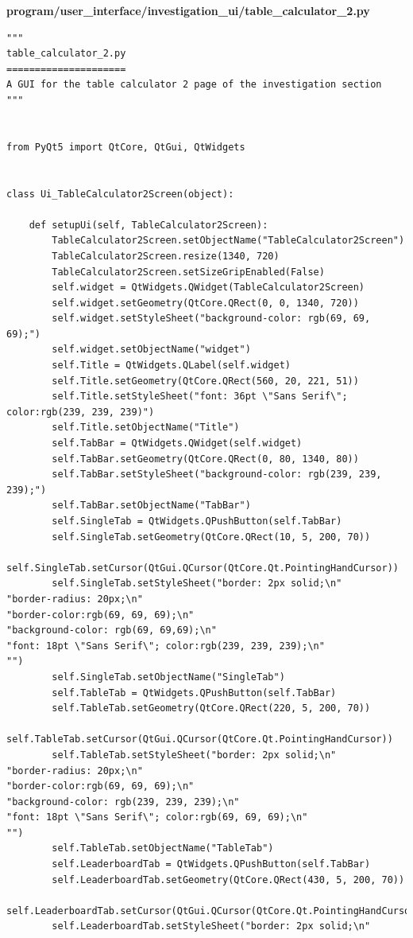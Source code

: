 \documentclass{article}
\begin{document}
\textbf{program/user\_interface/investigation\_ui/table\_calculator\_2.py}
\begin{lstlisting}
"""
table_calculator_2.py
=====================
A GUI for the table calculator 2 page of the investigation section
"""


from PyQt5 import QtCore, QtGui, QtWidgets


class Ui_TableCalculator2Screen(object):

    def setupUi(self, TableCalculator2Screen):
        TableCalculator2Screen.setObjectName("TableCalculator2Screen")
        TableCalculator2Screen.resize(1340, 720)
        TableCalculator2Screen.setSizeGripEnabled(False)
        self.widget = QtWidgets.QWidget(TableCalculator2Screen)
        self.widget.setGeometry(QtCore.QRect(0, 0, 1340, 720))
        self.widget.setStyleSheet("background-color: rgb(69, 69, 69);")
        self.widget.setObjectName("widget")
        self.Title = QtWidgets.QLabel(self.widget)
        self.Title.setGeometry(QtCore.QRect(560, 20, 221, 51))
        self.Title.setStyleSheet("font: 36pt \"Sans Serif\"; color:rgb(239, 239, 239)")
        self.Title.setObjectName("Title")
        self.TabBar = QtWidgets.QWidget(self.widget)
        self.TabBar.setGeometry(QtCore.QRect(0, 80, 1340, 80))
        self.TabBar.setStyleSheet("background-color: rgb(239, 239, 239);")
        self.TabBar.setObjectName("TabBar")
        self.SingleTab = QtWidgets.QPushButton(self.TabBar)
        self.SingleTab.setGeometry(QtCore.QRect(10, 5, 200, 70))
        self.SingleTab.setCursor(QtGui.QCursor(QtCore.Qt.PointingHandCursor))
        self.SingleTab.setStyleSheet("border: 2px solid;\n"
"border-radius: 20px;\n"
"border-color:rgb(69, 69, 69);\n"
"background-color: rgb(69, 69,69);\n"
"font: 18pt \"Sans Serif\"; color:rgb(239, 239, 239);\n"
"")
        self.SingleTab.setObjectName("SingleTab")
        self.TableTab = QtWidgets.QPushButton(self.TabBar)
        self.TableTab.setGeometry(QtCore.QRect(220, 5, 200, 70))
        self.TableTab.setCursor(QtGui.QCursor(QtCore.Qt.PointingHandCursor))
        self.TableTab.setStyleSheet("border: 2px solid;\n"
"border-radius: 20px;\n"
"border-color:rgb(69, 69, 69);\n"
"background-color: rgb(239, 239, 239);\n"
"font: 18pt \"Sans Serif\"; color:rgb(69, 69, 69);\n"
"")
        self.TableTab.setObjectName("TableTab")
        self.LeaderboardTab = QtWidgets.QPushButton(self.TabBar)
        self.LeaderboardTab.setGeometry(QtCore.QRect(430, 5, 200, 70))
        self.LeaderboardTab.setCursor(QtGui.QCursor(QtCore.Qt.PointingHandCursor))
        self.LeaderboardTab.setStyleSheet("border: 2px solid;\n"

\end{lstlisting}
\end{document}
